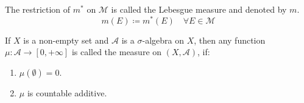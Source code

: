 \begin{definition}
    The restriction of $m^*$ on $\mathcal{M}$ is called the
    Lebesgue measure and denoted by $m$.
    \[ m(E) \coloneqq m^*(E) \quad \forall E \in \mathcal{M} \]
\end{definition}
\begin{definition}
    If $X$ is a non-empty set and $\mathcal{A}$ is a $\sigma$-algebra on $X$,
    then any function $\mu : \mathcal{A} \to [0, +\infty]$ is called the measure
    on $(X, \mathcal{A})$, if:
    \begin{enumerate}
        \item {
            $\mu(\emptyset) = 0$.
        }
        \item {
            $\mu$ is countable additive.
        }
    \end{enumerate}
\end{definition}
